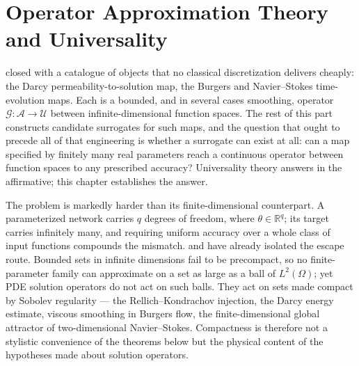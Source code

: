 
\chapter{Operator Approximation Theory and Universality}
\label{ch:part1-operator-approximation-theory-and-universa}
\label{sec:universality}

 closed with a catalogue of objects that no classical discretization delivers cheaply: the Darcy permeability-to-solution map, the Burgers and Navier--Stokes time-evolution maps. Each is a bounded, and in several cases smoothing, operator $\mathcal{G}:\mathcal{A}\to\mathcal{U}$ between infinite-dimensional function spaces. The rest of this part constructs candidate surrogates for such maps, and the question that ought to precede all of that engineering is whether a surrogate can exist at all: can a map specified by finitely many real parameters reach a continuous operator between function spaces to any prescribed accuracy? Universality theory answers in the affirmative; this chapter establishes the answer.

The problem is markedly harder than its finite-dimensional counterpart. A parameterized network carries $q$ degrees of freedom, where $\theta\in\mathbb{R}^{q}$; its target carries infinitely many, and requiring uniform accuracy over a whole class of input functions compounds the mismatch.  and  have already isolated the escape route. Bounded sets in infinite dimensions fail to be precompact, so no finite-parameter family can approximate on a set as large as a ball of $L^{2}(\Omega)$; yet PDE solution operators do not act on such balls. They act on sets made compact by Sobolev regularity --- the Rellich--Kondrachov injection, the Darcy energy estimate, viscous smoothing in Burgers flow, the finite-dimensional global attractor of two-dimensional Navier--Stokes. Compactness is therefore not a stylistic convenience of the theorems below but the physical content of the hypotheses made about solution operators.

